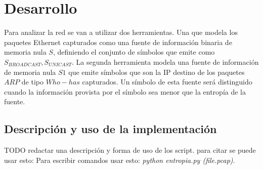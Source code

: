\section{Desarrollo}

\PARstart Para analizar la red se van a utilizar dos herramientas. Una que modela los paquetes Ethernet
capturados como una fuente de información binaria de memoria nula $S$, 
definiendo el conjunto de símbolos que emite como ${S_{BROADCAST}, S_{UNICAST}}$.
La segunda herramienta modela una fuente de información de memoria nula $S1$ 
que emite símbolos que son la IP destino de los paquetes $ARP$ de tipo $Who-has$ capturados.
Un símbolo de esta fuente será distinguido cuando la información provista
por el símbolo sea menor que la entropía de la fuente.

\subsection{Descripción y uso de la implementación}

TODO redactar una descripción y forma de uso de los script.
para citar se puede usar esto: \cite{wireshark}
Para escribir comandos usar esto: \textit{python entropia.py (file.pcap)}.

